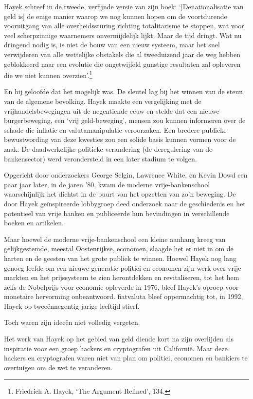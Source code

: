 \documentclass[
  a5paper,
  smalldemyvopaper,11pt,twoside,onecolumn,openright,extrafontsizes]{memoir}
\begin{document}
Hayek schreef in de tweede, verfijnde versie van zijn boek:
`{[}Denationalisatie van geld is{]} de enige manier waarop we nog kunnen
hopen om de voortdurende vooruitgang van alle overheidssturing richting
totalitarisme te stoppen, wat voor veel scherpzinnige waarnemers
onvermijdelijk lijkt. Maar de tijd dringt. Wat nu dringend nodig is, is
niet de bouw van een nieuw systeem, maar het snel verwijderen van alle
wettelijke obstakels die al tweeduizend jaar de weg hebben geblokkeerd
naar een evolutie die ongetwijfeld gunstige resultaten zal opleveren die
we niet kunnen overzien'.\footnote{Friedrich A. Hayek, `The Argument
  Refined', 134.}

En hij geloofde dat het mogelijk was. De sleutel lag bij het winnen van
de steun van de algemene bevolking. Hayek maakte een vergelijking met de
vrijhandelsbewegingen uit de negentiende eeuw en stelde dat een nieuwe
burgerbeweging, een `vrij geld-beweging', mensen zou kunnen informeren
over de schade die inflatie en valutamanipulatie veroorzaken. Een
bredere publieke bewustwording van deze kwesties zou een solide basis
kunnen vormen voor de zaak. De daadwerkelijke politieke verandering (de
deregulering van de bankensector) werd verondersteld in een later
stadium te volgen.

Opgericht door onderzoekers George Selgin, Lawrence White, en Kevin Dowd
een paar jaar later, in de jaren '80, kwam de moderne vrije-bankenschool
waarschijnlijk het dichtst in de buurt van het opzetten van zo'n
beweging. De door Hayek geïnspireerde lobbygroep deed onderzoek naar de
geschiedenis en het potentieel van vrije banken en publiceerde hun
bevindingen in verschillende boeken en artikelen.

Maar hoewel de moderne vrije-bankenschool een kleine aanhang kreeg van
gelijkgestemde, meestal Oostenrijkse, economen, slaagde het er niet in
om de harten en de geesten van het grote publiek te winnen. Hoewel Hayek
nog lang genoeg leefde om een nieuwe generatie politici en economen zijn
werk over vrije markten en het prijssysteem te zien herontdekken en
revitaliseren, tot het hem zelfs de Nobelprijs voor economie opleverde
in 1976, bleef Hayek's oproep voor monetaire hervorming onbeantwoord.
fiatvaluta bleef oppermachtig tot, in 1992, Hayek op tweeënnegentig
jarige leeftijd stierf.

Toch waren zijn ideeën niet volledig vergeten.

Het werk van Hayek op het gebied van geld diende kort na zijn overlijden
als inspiratie voor een groep hackers en cryptografen uit Californië.
Maar deze hackers en cryptografen waren niet van plan om politici,
economen en bankiers te overtuigen om de wet te veranderen.
\end{document}
